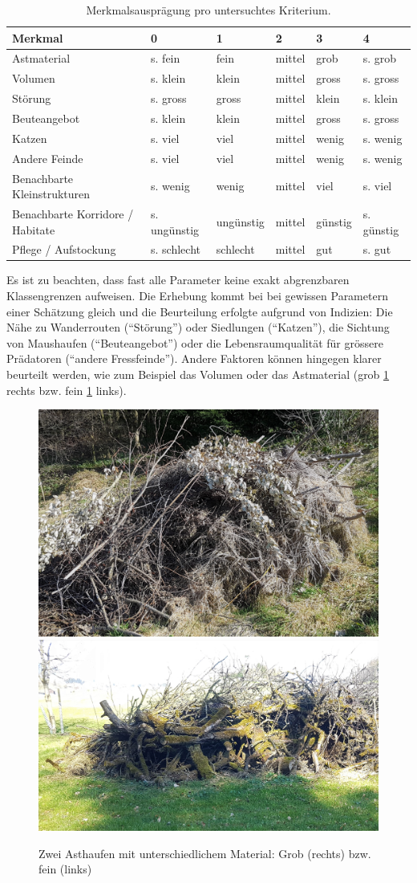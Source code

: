 \documentclass[
  oneside]{scrbook}
\begin{document}
\begin{table}

\caption{\label{tab:unnamed-chunk-3}Merkmalsausprägung pro untersuchtes Kriterium.}
\centering
\begin{tabular}[t]{l|l|l|l|l|l}
\hline
Merkmal & 0 & 1 & 2 & 3 & 4\\
\hline
Astmaterial & s. fein & fein & mittel & grob & s. grob\\
\hline
Volumen & s. klein & klein & mittel & gross & s. gross\\
\hline
Störung & s. gross & gross & mittel & klein & s. klein\\
\hline
Beuteangebot & s. klein & klein & mittel & gross & s. gross\\
\hline
Katzen & s. viel & viel & mittel & wenig & s. wenig\\
\hline
Andere Feinde & s. viel & viel & mittel & wenig & s. wenig\\
\hline
Benachbarte Kleinstrukturen & s. wenig & wenig & mittel & viel & s. viel\\
\hline
Benachbarte Korridore / Habitate & s. ungünstig & ungünstig & mittel & günstig & s. günstig\\
\hline
Pflege / Aufstockung & s. schlecht & schlecht & mittel & gut & s. gut\\
\hline
\end{tabular}
\end{table}

Es ist zu beachten, dass fast alle Parameter keine exakt abgrenzbaren Klassengrenzen aufweisen. Die Erhebung kommt bei bei gewissen Parametern einer Schätzung gleich und die Beurteilung erfolgte aufgrund von Indizien: Die Nähe zu Wanderrouten (``Störung'') oder Siedlungen (``Katzen''), die Sichtung von Maushaufen (``Beuteangebot'') oder die Lebensraumqualität für grössere Prädatoren (``andere Fressfeinde'').
Andere Faktoren können hingegen klarer beurteilt werden, wie zum Beispiel das Volumen oder das Astmaterial (grob \ref{fig:astmaterial} rechts bzw. fein \ref{fig:astmaterial} links).

\begin{figure}
\includegraphics[width=0.45\linewidth]{images/feines_astmaterial} \includegraphics[width=0.45\linewidth]{images/grobes_astmaterial} \caption{Zwei Asthaufen mit unterschiedlichem Material: Grob (rechts) bzw. fein (links)}\label{fig:astmaterial}
\end{figure}
\end{document}
